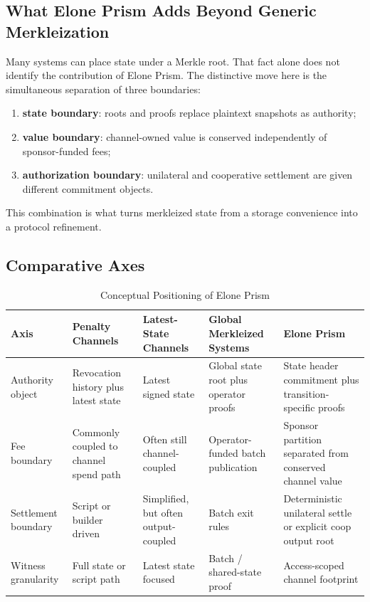 \documentclass[11pt,a4paper]{article}
\begin{document}
\subsection{What Elone Prism Adds Beyond Generic Merkleization}

Many systems can place state under a Merkle root. That fact alone does not identify the contribution of Elone Prism. The distinctive move here is the simultaneous separation of three boundaries:
\begin{enumerate}
    \item \textbf{state boundary}: roots and proofs replace plaintext snapshots as authority;
    \item \textbf{value boundary}: channel-owned value is conserved independently of sponsor-funded fees;
    \item \textbf{authorization boundary}: unilateral and cooperative settlement are given different commitment objects.
\end{enumerate}

This combination is what turns merkleized state from a storage convenience into a protocol refinement.

\subsection{Comparative Axes}

\begin{table}[htbp]
\centering
\caption{Conceptual Positioning of Elone Prism}
\label{tab:conceptual_positioning}
\small
\begin{tabularx}{\linewidth}{@{}l X X X X@{}}
\toprule
\textbf{Axis} & \textbf{Penalty Channels} & \textbf{Latest-State Channels} & \textbf{Global Merkleized Systems} & \textbf{Elone Prism} \\
\midrule
Authority object & Revocation history plus latest state & Latest signed state & Global state root plus operator proofs & State header commitment plus transition-specific proofs \\
Fee boundary & Commonly coupled to channel spend path & Often still channel-coupled & Operator-funded batch publication & Sponsor partition separated from conserved channel value \\
Settlement boundary & Script or builder driven & Simplified, but often output-coupled & Batch exit rules & Deterministic unilateral settle or explicit coop output root \\
Witness granularity & Full state or script path & Latest state focused & Batch / shared-state proof & Access-scoped channel footprint \\
\bottomrule
\end{tabularx}
\end{table}
\end{document}
